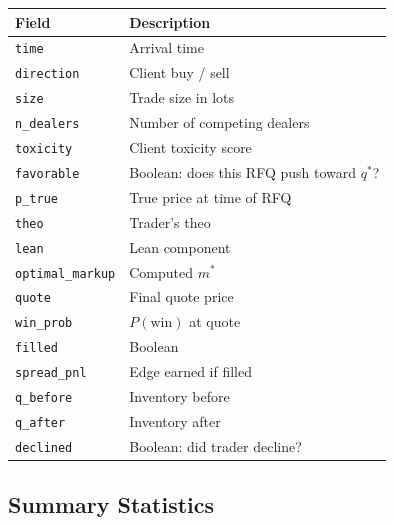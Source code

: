 \documentclass[11pt,a4paper]{article}
\begin{document}
\begin{table}[h!]
\centering\small
\begin{tabular}{@{}ll@{}}
\toprule
\textbf{Field} & \textbf{Description} \\
\midrule
\texttt{time} & Arrival time \\
\texttt{direction} & Client buy / sell \\
\texttt{size} & Trade size in lots \\
\texttt{n\_dealers} & Number of competing dealers \\
\texttt{toxicity} & Client toxicity score \\
\texttt{favorable} & Boolean: does this RFQ push toward $q^*$? \\
\texttt{p\_true} & True price at time of RFQ \\
\texttt{theo} & Trader's theo \\
\texttt{lean} & Lean component \\
\texttt{optimal\_markup} & Computed $m^*$ \\
\texttt{quote} & Final quote price \\
\texttt{win\_prob} & $P(\text{win})$ at quote \\
\texttt{filled} & Boolean \\
\texttt{spread\_pnl} & Edge earned if filled \\
\texttt{q\_before} & Inventory before \\
\texttt{q\_after} & Inventory after \\
\texttt{declined} & Boolean: did trader decline? \\
\bottomrule
\end{tabular}
\end{table}

\subsection{Summary Statistics}
\end{document}
